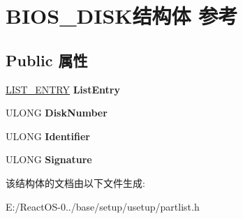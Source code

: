 \hypertarget{struct_b_i_o_s___d_i_s_k}{}\section{B\+I\+O\+S\+\_\+\+D\+I\+S\+K结构体 参考}
\label{struct_b_i_o_s___d_i_s_k}
\subsection*{Public 属性}
\begin{DoxyCompactItemize}
\item 
\mbox{\label{struct_b_i_o_s___d_i_s_k_af8140aad18fee28160589641220d6e11}} 
\hyperlink{struct___l_i_s_t___e_n_t_r_y}{L\+I\+S\+T\+\_\+\+E\+N\+T\+RY} {\bfseries List\+Entry}
\item 
\mbox{\label{struct_b_i_o_s___d_i_s_k_a379c6fb06be716a6e0dce029c174637e}} 
U\+L\+O\+NG {\bfseries Disk\+Number}
\item 
\mbox{\label{struct_b_i_o_s___d_i_s_k_ad0bf39bc805e65b7e0413a665a85cdc1}} 
U\+L\+O\+NG {\bfseries Identifier}
\item 
\mbox{\label{struct_b_i_o_s___d_i_s_k_a71d6b91c39f6db3d6190fcf835ea1b1c}} 
U\+L\+O\+NG {\bfseries Signature}
\end{DoxyCompactItemize}


该结构体的文档由以下文件生成\+:\begin{DoxyCompactItemize}
\item 
E\+:/\+React\+O\+S-\/0../base/setup/usetup/partlist.\+h\end{DoxyCompactItemize}
